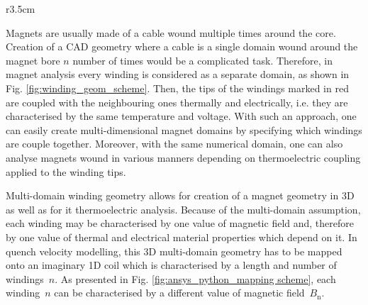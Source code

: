 
\begin{wrapfigure}{r}{3.5cm}
\centering
{}
\caption{Domain representation with multiple windings}
\label{fig:winding_geom_scheme}
\end{wrapfigure} 

Magnets are usually made of a cable wound multiple times around the core. Creation of a CAD geometry where a cable is a single domain wound around the magnet bore $n$ number of times would be a complicated task. Therefore, in magnet analysis every winding  is considered as a separate domain, as shown in Fig. \ref{fig:winding_geom_scheme}. Then, the tips of the windings marked in red are coupled with the neighbouring ones thermally and electrically, i.e. they are characterised by the same temperature and voltage. With such an approach, one can easily create multi-dimensional magnet domains by specifying which windings are couple together. Moreover, with the same numerical domain, one can also analyse magnets wound in various manners depending on thermoelectric coupling applied to the winding tips. 

Multi-domain winding geometry allows for creation of a magnet geometry in 3D as well as for it thermoelectric analysis. Because of the multi-domain assumption, each winding may be characterised by one value of magnetic field and, therefore by one value of thermal and electrical material properties which depend on it. In quench velocity modelling, this 3D multi-domain geometry has to be mapped onto an imaginary 1D coil which is characterised by a length and number of windings~$n$. As presented in Fig. \ref{fig:ansys_python_mapping scheme}, each winding~$n$ can be characterised by a different value of magnetic field~$B_\text{n}$.

